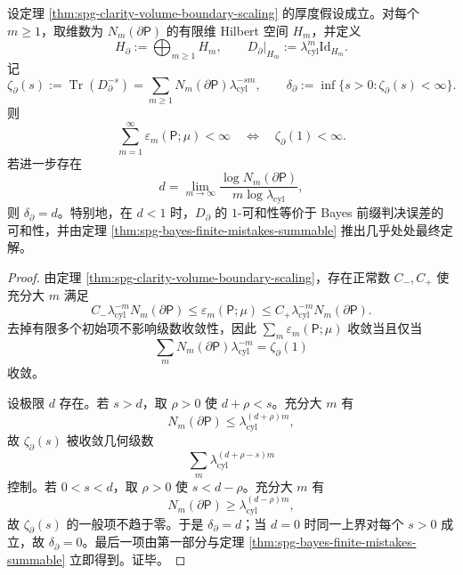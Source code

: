\begin{proposition}[边界柱清晰度的谱求和判据]\label{prop:distill-connes-boundary-clarity-summability}
设定理 \ref{thm:spg-clarity-volume-boundary-scaling} 的厚度假设成立。对每个 \(m\ge1\)，取维数为 \(N_m(\partial\mathsf P)\) 的有限维 Hilbert 空间 \(H_m\)，并定义
\[
H_{\partial}:=\bigoplus_{m\ge1}H_m,\qquad
D_{\partial}\big|_{H_m}:=\lambda_{\mathrm{cyl}}^m\mathrm{Id}_{H_m}.
\]
记
\[
\zeta_{\partial}(s):=\operatorname{Tr}(D_{\partial}^{-s})
=\sum_{m\ge1}N_m(\partial\mathsf P)\lambda_{\mathrm{cyl}}^{-sm},\qquad
\delta_{\partial}:=\inf\{s>0:\zeta_{\partial}(s)<\infty\}.
\]
则
\[
\sum_{m=1}^{\infty}\varepsilon_m(\mathsf P;\mu)<\infty
\quad\Longleftrightarrow\quad
\zeta_{\partial}(1)<\infty.
\]
若进一步存在
\[
d=\lim_{m\to\infty}\frac{\log N_m(\partial\mathsf P)}{m\log\lambda_{\mathrm{cyl}}},
\]
则 \(\delta_{\partial}=d\)。特别地，在 \(d<1\) 时，\(D_{\partial}\) 的 \(1\)-可和性等价于 Bayes 前缀判决误差的可和性，并由定理 \ref{thm:spg-bayes-finite-mistakes-summable} 推出几乎处处最终定解。
\end{proposition}
\begin{proof}
由定理 \ref{thm:spg-clarity-volume-boundary-scaling}，存在正常数 \(C_-,C_+\) 使充分大 \(m\) 满足
\[
C_-\lambda_{\mathrm{cyl}}^{-m}N_m(\partial\mathsf P)\le
\varepsilon_m(\mathsf P;\mu)\le
C_+\lambda_{\mathrm{cyl}}^{-m}N_m(\partial\mathsf P).
\]
去掉有限多个初始项不影响级数收敛性，因此 \(\sum_m\varepsilon_m(\mathsf P;\mu)\) 收敛当且仅当
\[
\sum_m N_m(\partial\mathsf P)\lambda_{\mathrm{cyl}}^{-m}=\zeta_{\partial}(1)
\]
收敛。

设极限 \(d\) 存在。若 \(s>d\)，取 \(\rho>0\) 使 \(d+\rho<s\)。充分大 \(m\) 有
\[
N_m(\partial\mathsf P)\le \lambda_{\mathrm{cyl}}^{(d+\rho)m},
\]
故 \(\zeta_{\partial}(s)\) 被收敛几何级数
\[
\sum_m \lambda_{\mathrm{cyl}}^{(d+\rho-s)m}
\]
控制。若 \(0<s<d\)，取 \(\rho>0\) 使 \(s<d-\rho\)。充分大 \(m\) 有
\[
N_m(\partial\mathsf P)\ge \lambda_{\mathrm{cyl}}^{(d-\rho)m},
\]
故 \(\zeta_{\partial}(s)\) 的一般项不趋于零。于是 \(\delta_{\partial}=d\)；当 \(d=0\) 时同一上界对每个 \(s>0\) 成立，故 \(\delta_{\partial}=0\)。最后一项由第一部分与定理 \ref{thm:spg-bayes-finite-mistakes-summable} 立即得到。证毕。
\end{proof}

\endinput
